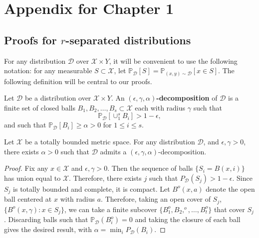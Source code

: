 \graphicspath{{./chapters/chapter0/}}

\def\D{{\mathcal D}}
\def\X{\mathcal X}
\def\R{\mathbb R}
\def\Y{\{\pm 1\}}
\def\w{\hat{w}}
\def\P{\mathbb{P}}
\def\I{\hat{I}}
\def\b{g^*}
\def\r{\rho}
\def\rcons{r-consistent}
\def\rconsy{r-consistency}
\def\ap{AdvPrun}
\def\ga{RobustNonPar}

\chapter{Appendix for Chapter 1}
\section{Proofs for $r$-separated distributions}

For any distribution $\D$ over $\X \times Y$, it will be convenient to use the following notation: for any measurable $S \subset \X$, let $\P_\D[S] = \P_{(x,y) \sim \D}[x \in S]$. The following definition will be central to our proofs. 

\begin{defn}
Let $\D$ be a distribution over $\X \times Y$. An \textbf{$(\epsilon, \gamma, \alpha)$-decomposition} of $\D$ is a finite set of closed balls $B_1, B_2, \dots, B_s \subset \X$ each with radius $\gamma$ such that $$\P_\D[\cup_1^s B_i] > 1 - \epsilon,$$ and such that $\P_\D[B_i] \geq \alpha > 0$ for $1 \leq i \leq s$. 
\end{defn}


\begin{lem}\label{lem_balls}
Let $\X$ be a totally bounded metric space. For any distribution $\D$, and $\epsilon, \gamma > 0$, there exists $\alpha > 0$ such that $\D$ admits a $(\epsilon, \gamma, \alpha)$-decomposition. 
\end{lem}

\begin{proof}
Fix any $x \in \X$ and $\epsilon, \gamma > 0$. Then the sequence of balls $\{S_i = B(x, i)\}$ has union equal to $\X$. Therefore, there exists $j$ such that $P_\D(S_j) > 1 - \epsilon$. Since $S_j$ is totally bounded and complete, it is compact. Let $B^o(x, a)$ denote the open ball centered at $x$ with radius $a$. Therefore, taking an open cover of $S_j$, $\{B^o(x, \gamma): x \in S_j\}$, we can take a finite subcover $\{B_1^o, B_2,^o, \dots, B_t^o\}$ that cover $S_j$. Discarding balls such that $\P_\D(B_i^o) = 0$ and taking the closure of each ball gives the desired result, with $\alpha = \min_{i}P_\D(B_i)$.  
\end{proof}

